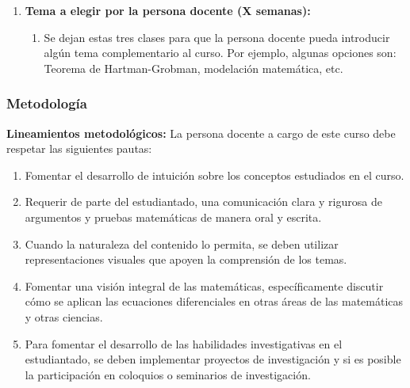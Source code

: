 \begin{refsection}
\begin{enumerate}
\item \textbf{Tema a elegir por la persona docente (X semanas):}
\begin{enumerate}
    \item Se dejan estas tres clases para que la persona docente pueda introducir algún tema complementario al curso. Por ejemplo, algunas opciones son: Teorema de Hartman-Grobman, modelación matemática, etc.
\end{enumerate}

\end{enumerate}

\subsubsection*{Metodología}

\noindent \textbf{Lineamientos metodológicos:} La persona docente a cargo de este curso debe respetar las siguientes pautas:
\begin{enumerate}
    \item Fomentar el desarrollo de intuición sobre los conceptos estudiados en el curso. 
    \item Requerir de parte del estudiantado, una comunicación clara y rigurosa de argumentos y pruebas matemáticas de manera oral y escrita.
    \item Cuando la naturaleza del contenido lo permita, se deben utilizar representaciones visuales que apoyen la comprensión de los temas.
    \item Fomentar una visión integral de las matemáticas, específicamente discutir cómo se aplican las ecuaciones diferenciales en otras áreas de las matemáticas y otras ciencias.
    \item Para fomentar el desarrollo de las habilidades investigativas en el estudiantado, se deben implementar proyectos de investigación y si es posible la participación en coloquios o seminarios de investigación.
\end{enumerate}


\end{refsection}

